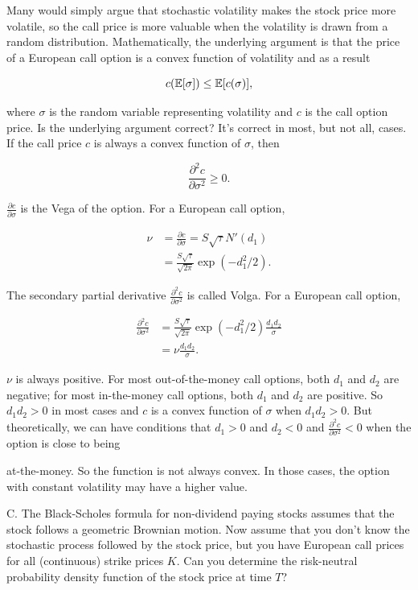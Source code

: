 \begin{solution}
Many would simply argue that stochastic volatility makes the stock price more volatile,
so the call price is more valuable when the volatility is drawn from a random distribution.
Mathematically, the underlying argument is that the price of a European call option is a
convex function of volatility and as a result

\[
c(\mathbb{E}[\sigma])\leq \mathbb{E}[c(\sigma)],
\]

where $\sigma$ is the random variable representing volatility and $c$ is the call option
price. Is the underlying argument correct? It's correct in most, but not all, cases. If the
call price $c$ is always a convex function of $\sigma$, then

\[
\frac{\partial^2c}{\partial\sigma^2}\geq0.
\]

$\frac{\partial c}{\partial\sigma}$ is the Vega of the option. For a European call option,

\[
\begin{aligned}
\nu&=\frac{\partial c}{\partial\sigma}=S\sqrt{\tau}N'(d_1)\\
&=\frac{S\sqrt{\tau}}{\sqrt{2\pi}}\exp(-d_1^2/2).
\end{aligned}
\]

The secondary partial derivative $\frac{\partial^2c}{\partial\sigma^2}$ is called Volga.
For a European call option,

\[
\begin{aligned}
\frac{\partial^2c}{\partial\sigma^2}
&=\frac{S\sqrt{\tau}}{\sqrt{2\pi}}\exp(-d_1^2/2)\frac{d_1d_2}{\sigma}\\
&=\nu\frac{d_1d_2}{\sigma}.
\end{aligned}
\]

$\nu$ is always positive. For most out-of-the-money call options, both $d_1$ and $d_2$
are negative; for most in-the-money call options, both $d_1$ and $d_2$ are positive. So
$d_1d_2>0$ in most cases and $c$ is a convex function of $\sigma$ when $d_1d_2>0$.
But theoretically, we can have conditions that $d_1>0$ and $d_2<0$ and
$\frac{\partial^2c}{\partial\sigma^2}<0$ when the option is close to being


at-the-money. So the function is not always convex. In those cases, the option with
constant volatility may have a higher value.

\end{solution}

\begin{problem}{C. The Black-Scholes formula for non-dividend paying stocks assumes that the stock
follows a geometric Brownian motion. Now assume that you don't know the stochastic
process followed by the stock price, but you have European call prices for all (continuous)
strike prices $K$. Can you determine the risk-neutral probability density function of the
stock price at time $T$?}
\end{problem}

